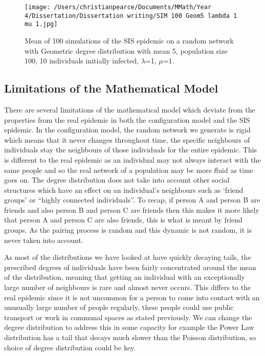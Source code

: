 \documentclass{uonmathsreport}
\begin{document}
\begin{figure}
\begin{center}
\texttt{[image: /Users/christianpearce/Documents/MMath/Year 4/Dissertation/Dissertation writing/SIM 100 Geom5 lambda 1 mu 1.jpg]}
\end{center}
\caption{Mean of 100 simulations of the SIS epidemic on a random network with Geometric degree distribution with mean 5, population size 100, 10 individuals initially infected, $\lambda$=1, $\mu$=1.}
\label{SIM 100 Geom5 lambda 1 mu 1}
\end{figure}

\subsection{Limitations of the Mathematical Model} \label{subsub:5.6}

There are several limitations of the mathematical model which deviate from the properties from the real epidemic in both the configuration model and the SIS epidemic. In the configuration model, the random network we generate is rigid which means that it never changes throughout time, the specific neighbours of individuals stay the neighbours of those individuals for the entire epidemic. This is different to the real epidemic as an individual may not always interact with the same people and so the real network of a population may be more fluid as time goes on. The degree distribution does not take into account other social structures which have an effect on an individual’s neighbours such as ‘friend groups’ \cite{bibandersson1} or “highly connected individuals”. To recap, if person A and person B are friends and also person B and person C are friends then this makes it more likely that person A and person C are also friends, this is what is meant by friend groups. As the pairing process is random and this dynamic is not random, it is never taken into account. 

As most of the distributions we have looked at have quickly decaying tails, the prescribed degrees of individuals have been fairly concentrated around the mean of the distribution, meaning that getting an individual with an exceptionally large number of neighbours is rare and almost never occurs. This differs to the real epidemic since it is not uncommon for a person to come into contact with an unusually large number of people regularly, these people could use public transport or work in communal spaces as stated previously. We can change the degree distribution to address this in some capacity for example the Power Law distribution has a tail that decays much slower than the Poisson distribution, so choice of degree distribution could be key.
\end{document}

